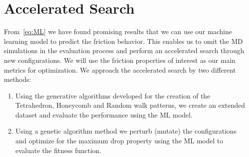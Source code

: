 \section{Accelerated Search}
From~\cref{eq:ML} we have found promising results that we can use our machine learning model to predict the friction behavior. This enables us to omit the \acrshort{MD} simulations in the evaluation process and perform an accelerated search through new configurations. We will use the friction properties of interest as our main metrics for optimization. We approach the accelerated search by two different methods:
\begin{enumerate}
  \item Using the generative algorithms developed for the creation of the Tetrahedron, Honeycomb and Random walk patterns, we create an extended dataset and evaluate the performance using the \acrshort{ML} model.
  \item Using a genetic algorithm method we perturb (mutate) the configurations and optimize for the maximum drop property using the \acrshort{ML} model to evaluate the fitness function. 
\end{enumerate}

